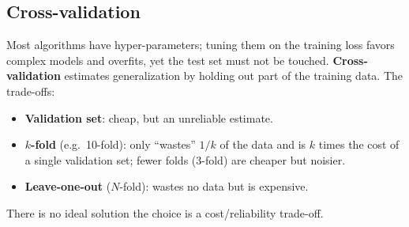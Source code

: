 \subsection{Cross-validation}
Most algorithms have hyper-parameters; tuning them on the training loss favors
complex models and overfits, yet the test set must not be touched. \textbf{Cross-
validation} estimates generalization by holding out part of the training data.
The trade-offs:
\begin{itemize}
  \item \textbf{Validation set}: cheap, but an unreliable estimate.
  \item \textbf{$k$-fold} (e.g.\ 10-fold): only ``wastes'' $1/k$ of the data and
  is $k$ times the cost of a single validation set; fewer folds (3-fold) are
  cheaper but noisier.
  \item \textbf{Leave-one-out} ($N$-fold): wastes no data but is expensive.
\end{itemize}
There is no ideal solution \textrightarrow{} the choice is a cost/reliability
trade-off.
